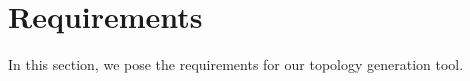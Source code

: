 \section{Requirements\label{sec:topologies.requirements}}

In this section, we pose the requirements for our topology generation tool.
